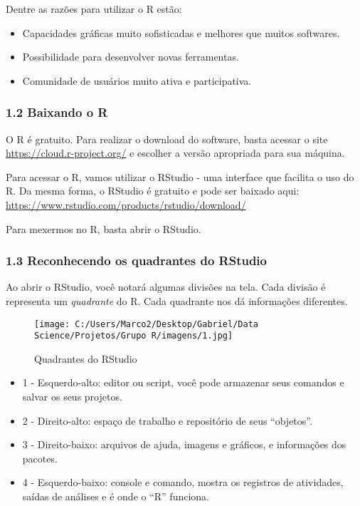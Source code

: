\documentclass[
]{article}
\providecommand{\tightlist}{%
  \setlength{\itemsep}{0pt}\setlength{\parskip}{0pt}}
\begin{document}
Dentre as razões para utilizar o R estão:

\begin{itemize}
\tightlist
\item
  Capacidades gráficas muito sofisticadas e melhores que muitos
  softwares.
\item
  Possibilidade para desenvolver novas ferramentas.
\item
  Comunidade de usuários muito ativa e participativa.
\end{itemize}

\hypertarget{baixando-o-r}{%
\subsubsection{1.2 Baixando o R}\label{baixando-o-r}}

O R é gratuito. Para realizar o download do software, basta acessar o
site \url{https://cloud.r-project.org/} e escolher a versão apropriada
para sua máquina.

Para acessar o R, vamos utilizar o RStudio - uma interface que facilita
o uso do R. Da mesma forma, o RStudio é gratuito e pode ser baixado
aqui: \url{https://www.rstudio.com/products/rstudio/download/}

Para mexermos no R, basta abrir o RStudio.

\hypertarget{reconhecendo-os-quadrantes-do-rstudio}{%
\subsubsection{1.3 Reconhecendo os quadrantes do
RStudio}\label{reconhecendo-os-quadrantes-do-rstudio}}

Ao abrir o RStudio, você notará algumas divisões na tela. Cada divisão é
representa um \emph{quadrante} do R. Cada quadrante nos dá informações
diferentes.

\begin{figure}
\centering
\texttt{[image: C:/Users/Marco2/Desktop/Gabriel/Data Science/Projetos/Grupo R/imagens/1.jpg]}
\caption{Quadrantes do RStudio}
\end{figure}

\begin{itemize}
\tightlist
\item
  1 - Esquerdo-alto: editor ou script, você pode armazenar seus comandos
  e salvar os seus projetos.
\item
  2 - Direito-alto: espaço de trabalho e repositório de seus
  ``objetos''.
\item
  3 - Direito-baixo: arquivos de ajuda, imagens e gráficos, e
  informações dos pacotes.
\item
  4 - Esquerdo-baixo: console e comando, mostra os registros de
  atividades, saídas de análises e é onde o ``R'' funciona.
\end{itemize}
\end{document}
